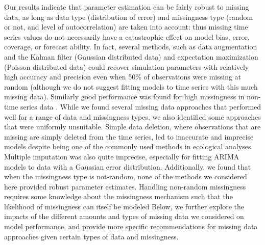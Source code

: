 \documentclass{article}
\begin{document}
\begin{linenumbers}
Our results indicate that parameter estimation can be fairly robust to missing data, as long as data type (distribution of error) and missingness type (random or not, and level of autocorrelation) are taken into account: thus missing time series values do not necessarily have a catastrophic effect on model bias, error, coverage, or forecast ability. In fact, several methods, such as data augmentation and the Kalman filter (Gaussian distributed data) and expectation maximization (Poisson distributed data) could recover simulation parameters with relatively high accuracy and precision even when 50\% of observations were missing at random (although we do not suggest fitting models to time series with this much missing data). Similarly good performance was found for high missingness in non-time series data \citep{graham_missing_2009}. While we found several missing data approaches that performed well for a range of data and missingness types, we also identified some approaches that were uniformly unsuitable. Simple data deletion, where observations that are missing are simply deleted from the time series, led to inaccurate and imprecise models despite being one of the commonly used methods in ecological analyses. Multiple imputation was also quite imprecise, especially for fitting ARIMA models to data with a Gaussian error distribution. Additionally, we found that when the missingness type is not-random, none of the methods we considered here provided robust parameter estimates. Handling non-random missingness requires some knowledge about the missingness mechanism such that the likelihood of missingness can itself be modeled \citep[e.g.,][]{Sotto2011_mnar, McCall2014_mnar, Shoari2018_mnar} Below, we further explore the impacts of the different amounts and types of missing data we considered on model performance, and provide more specific recommendations for missing data approaches given certain types of data and missingness.


\end{linenumbers}
\end{document}
